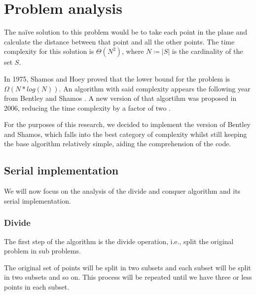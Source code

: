\section{Problem analysis}
\label{sec:problem_analysis}

The na\"ive solution to this problem would be to take each point
in the plane and calculate the distance between that point and all
the other points. The time complexity for this solution is $\Theta(N^2)$,
where $N\coloneqq|S|$ is the cardinality of the set $S$.


In 1975, Shamos and Hoey proved that the lower bound for the problem is $\Omega(N * log(N))$\cite[§2, theorem 1]{closest_pair_definition}. An algorithm with said complexity appears
the following year from Bentley and Shamos \cite{divide_and_conq_3NlgN}.
A new version of that algortihm was proposed in 2006, reducing the time complexity by a factor of two \cite{ge2006improved}.

For the purposes of this research, we decided to implement the version of Bentley and Shamos, which falls into the best category of complexity whilst still keeping the base algorithm relatively simple, aiding the comprehension of the code.

\subsection{Serial implementation}

We will now focus on the analysis of the divide and conquer algorithm
and its serial implementation.

\subsubsection{Divide}
The first step of the algorithm is the divide operation, i.e.,
split the original problem in sub problems.

The original set of points will be split in two subsets and each
subset will be split in two subsets and so on. This process will be repeated
until we have three or less points in each subset.

